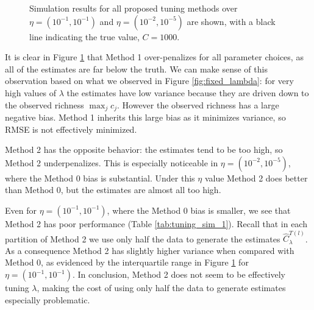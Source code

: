 \documentclass[oupdraft]{bio}
\begin{document}
\begin{figure}[t]
\caption{Simulation results for all proposed tuning methods over $\eta = (10^{-1}, 10^{-1})$ and $\eta = (10^{-2}, 10^{-5})$ are shown, with a black line indicating the true value, $C = 1000$.
\label{fig:tuning_sim_1}}
\centering{}
\end{figure}

It is clear in Figure \ref{fig:tuning_sim_1} that Method 1 over-penalizes for all parameter choices, as all of the estimates are far below the truth.  We can make sense of this observation based on what we observed in Figure \ref{fig:fixed_lambda}: for very high values of $\lambda$ the estimates have low variance because they are driven down to the observed richness $\max_j c_j$.  However the observed richness has a large negative bias.  Method 1 inherits this large bias as it minimizes variance, so RMSE is not effectively minimized.

Method 2 has the opposite behavior: the estimates tend to be too high, so Method 2 underpenalizes.  This is especially noticeable in $\eta = (10^{-2}, 10^{-5})$, where the Method 0 bias is substantial.  Under this $\eta$ value Method 2 does better than Method 0, but the estimates are almost all too high.

Even for $\eta = (10^{-1}, 10^{-1})$, where the Method 0 bias is smaller, we see that Method 2 has poor performance (Table \ref{tab:tuning_sim_1}).  Recall that in each partition of Method 2 we use only half the data to generate the estimates $\widehat{C}^{T(l)}_{\lambda}$.  As a consequence Method 2 has slightly higher variance when compared with Method 0, as evidenced by the interquartile range in Figure \ref{fig:tuning_sim_1} for $\eta = (10^{-1}, 10^{-1})$.  In conclusion, Method 2 does not seem to be effectively tuning $\lambda$, making the cost of using only half the data to generate estimates especially problematic.
\end{document}
